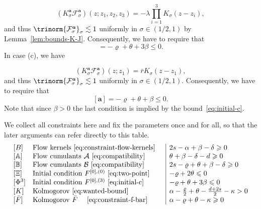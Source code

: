 \documentclass{article}
\numberwithin{equation}{section}
\theoremstyle{plain}
\theoremstyle{definition}
\begin{document}
\[ (K_{\sigma}^{\boldsymbol{a}} \mathcal{F}^{\boldsymbol{a}}_{\sigma}) (z ; z_1,
   z_2, z_3) = - \lambda \prod_{i = 1}^3 K_{\sigma} (z - z_i), \]
and thus $\trinorm{ \mathcal{F}^{\boldsymbol{a}}_{\sigma} }_{\sigma}
\lesssim 1$ uniformly in $\sigma \in (1/2, 1)$ by Lemma~\ref{lem:bounds-K-J}.
Consequently, we have to require that
\begin{equation}
  [\boldsymbol{a}] = - \varrho + \theta + 3 \beta \leqslant 0
  \label{eq:initial-c} .
\end{equation}
In case (c), we have


\[ (K_{\sigma}^{\boldsymbol{a}} \mathcal{F}^{\boldsymbol{a}}_{\sigma}) (z ; z_1) =
   \bar{r} K_{\sigma} (z - z_1), \]
and thus $\trinorm{ \mathcal{F}^{\boldsymbol{a}}_{\sigma} }_{\sigma}
\lesssim 1$ uniformly in $\sigma \in (1/2, 1)$. Consequently, we have to require that
\[ [\boldsymbol{a}] = - \varrho + \theta + \beta \leqslant 0. \]
Note that since $\beta > 0$ the last condition is implied by the
bound~\eqref{eq:initial-c}.

We collect all constraints here and fix the parameters once and for all, so
that the later arguments can refer directly to this table.
\begin{equation}
  \begin{array}{ll|l}
    {}[B] & \text{Flow kernels~$\eqref{eq:constraint-flow-kernels}$} \quad
    & 2 s - \alpha + \beta - \delta \geqslant 0\\
    {}[\mathbb{A}] & \text{Flow cumulants
    $\mathcal{A}$~\eqref{eq:compatibility}}  & \theta + \beta - \delta - d
    \geqslant 0\\
    {}[\mathbb{B}] & \text{Flow cumulants
    $\mathcal{B}$~\eqref{eq:compatibility}} & 2 s - \varrho + \theta + \beta -
    \delta \geqslant 0\\
    {}[\Xi] & \text{Initial condition $F^{[0], (0)}$~\eqref{eq:two-point}} & -
    \varrho + 2 \theta \leqslant 0\\
    {}[\Phi^3] & \text{Initial condition $F^{[0], (3)}$~\eqref{eq:initial-c}}
    & - \varrho + \theta + 3 \beta \leqslant 0\\
    {}[K] & \text{Kolmogorov~$\eqref{eq:wanted-bound}$} \quad & \alpha -
    \frac{\varrho}{2} + \theta - \frac{d + 2 s}{2} - \kappa > 0\\
    {}[\bar{F}] & \text{Kolmogorov $\bar{F}$~$\quad
    \eqref{eq:constraint-f-bar}$} & \alpha - \varrho + \theta - \kappa
    \geqslant 0
  \end{array} \label{eq:summary-ineq}
\end{equation}
\end{document}
